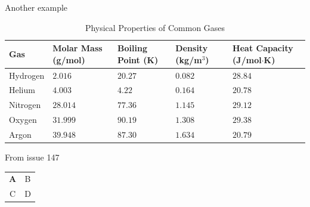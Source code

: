 Another example

\begin{table}[h!]
  \centering
  \caption{Physical Properties of Common Gases}
  \label{tab:gases}
  \begin{tabularx}{\textwidth}{|l|X|X|X|X|}
    \hline
    \textbf{Gas} & \textbf{Molar Mass (g/mol)} & \textbf{Boiling Point (K)} & \textbf{Density (kg/m$^3$)} & \textbf{Heat Capacity (J/mol$\cdot$K)} \\
    \hline
    Hydrogen     & $2.016$                     & $20.27$                    & $0.082$                     & $28.84$ \\
    Helium       & $4.003$                     & $4.22$                     & $0.164$                     & $20.78$ \\
    Nitrogen     & $28.014$                    & $77.36$                    & $1.145$                     & $29.12$ \\
    Oxygen       & $31.999$                    & $90.19$                    & $1.308$                     & $29.38$ \\
    Argon        & $39.948$                    & $87.30$                    & $1.634$                     & $20.79$ \\
    \hline
  \end{tabularx}
\end{table}

From issue 147

\begin{tabular}{cc}
  \textbf{A} & B \\
  C          & D
\end{tabular}


